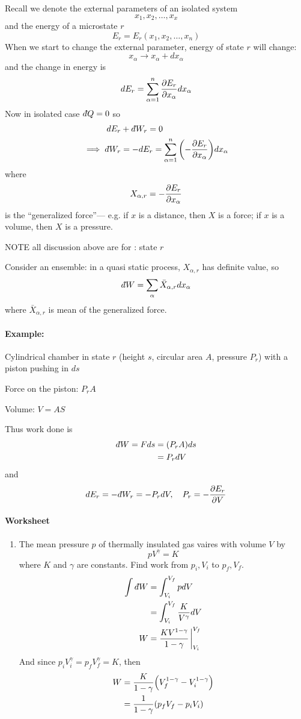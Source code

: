 \documentclass[../main.tex]{subfiles}
\begin{document}
Recall we denote the external parameters of an isolated system
\[x_1, x_2, \dots, x_x \]
and the energy of a microstate $r$
\[E_r = E_r(x_1, x_2, \dots, x_n )\]
When we start to change the external parameter, energy of state $r$ will change:
\[x_\alpha \to x_\alpha + d x_\alpha \]
and the change in energy is
\[dE_r = \sum_{\alpha = 1}^n \pdv{E_r}{x_\alpha} dx_\alpha\]
Now in isolated case $d\hspace*{-0.08em}\bar{}\hspace*{0.1em} Q = 0$ so
\begin{align*}
    dE_r &+ \dbar W_r = 0 \\
    \implies \dbar W_r &= -dE_r = \sum_{\alpha = 1}^n \qt(-\pdv{E_r}{x_\alpha}) dx_\alpha
\end{align*}
where
\[X_{\alpha, r} = -\pdv{E_r}{x_\alpha} \]
is the ``generalized force''--- e.g. if $x$ is a distance, then $X$ is a force; if $x$ is a volume, then $X$ is a pressure.

NOTE all discussion above are for : state $r$

Consider an ensemble: in a quasi static process, $X_{\alpha, r}$ has definite value, so
\[d\hspace*{-0.08em}\bar{}\hspace*{0.1em} W = \sum_\alpha \bar X_{\alpha, r}dx_\alpha\]
where $\bar X_{\alpha, r}$ is mean of the generalized force.

\paragraph*{Example:} Cylindrical chamber in state $r$ (height $s$, circular area $A$, pressure $P_r$) with a piston pushing in $ds$

Force on the piston: $P_r A$

Volume: $V = A S$

Thus work done is 
\begin{align*}
    d\hspace*{-0.08em}\bar{}\hspace*{0.1em} W = F d s &= (P_r A) d s\\
    &= P_r dV
\end{align*}
and 
\begin{align*}
    dE_r = -d\hspace*{-0.08em}\bar{}\hspace*{0.1em} W_r = -P_r dV, \quad 
    P_r = -\pdv{E_r}{V}
\end{align*}

\paragraph*{Worksheet}
\begin{enumerate}
    \item The mean pressure $p$ of thermally insulated gas vaires with volume $V$ by
    \[pV^\gamma = K \]
    where $K$ and $\gamma$ are constants. Find work from $p_i, V_i$ to $p_f, V_f$.
    \begin{align*}
        \int \dbar W &= \int_{V_i}^{V_f} p dV \\
        &= \int_{V_i}^{V_f} \frac{K}{V^\gamma} dV \\
        W &= \frac{KV^{1 - \gamma}}{1 - \gamma} \eval_{V_i}^{V_f}
    \end{align*}
    And since $p_i V_i^\gamma = p_f V_f^\gamma = K$, then
    \begin{align*}
        W &= \frac{K}{1 - \gamma} \qt(V_f^{1 - \gamma} - V_i^{1 - \gamma}) \\
        &= \frac{1}{1 - \gamma} \qt(p_f V_f - p_i V_i)
    \end{align*}
\end{enumerate}
\end{document}
